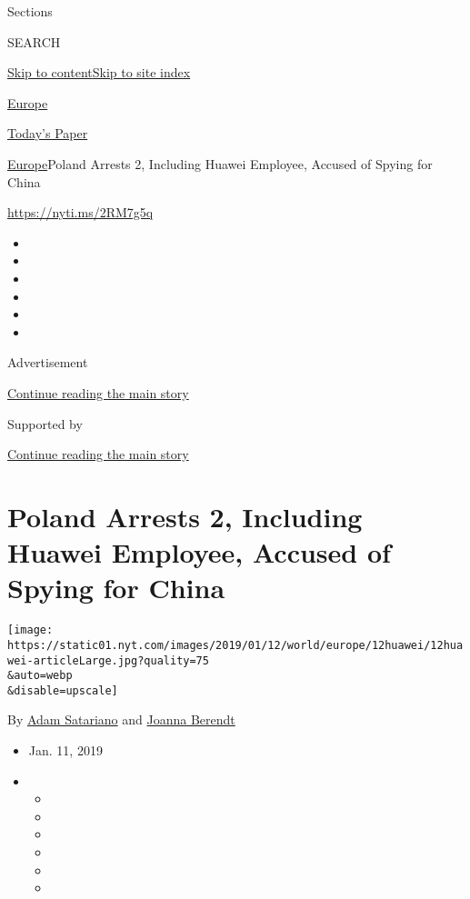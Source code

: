 Sections

SEARCH

\protect\hyperlink{site-content}{Skip to
content}\protect\hyperlink{site-index}{Skip to site index}

\href{https://www.nytimes.com/section/world/europe}{Europe}

\href{https://myaccount.nytimes.com/auth/login?response_type=cookie\&client_id=vi}{}

\href{https://www.nytimes.com/section/todayspaper}{Today's Paper}

\href{/section/world/europe}{Europe}\textbar{}Poland Arrests 2,
Including Huawei Employee, Accused of Spying for China

\url{https://nyti.ms/2RM7g5q}

\begin{itemize}
\item
\item
\item
\item
\item
\item
\end{itemize}

Advertisement

\protect\hyperlink{after-top}{Continue reading the main story}

Supported by

\protect\hyperlink{after-sponsor}{Continue reading the main story}

\hypertarget{poland-arrests-2-including-huawei-employee-accused-of-spying-for-china}{%
\section{Poland Arrests 2, Including Huawei Employee, Accused of Spying
for
China}\label{poland-arrests-2-including-huawei-employee-accused-of-spying-for-china}}

\texttt{[image: https://static01.nyt.com/images/2019/01/12/world/europe/12huawei/12huawei-articleLarge.jpg?quality=75\\\&auto=webp\\\&disable=upscale]}

By \href{https://www.nytimes.com/by/adam-satariano}{Adam Satariano} and
\href{https://www.nytimes.com/by/joanna-berendt}{Joanna Berendt}

\begin{itemize}
\item
  Jan. 11, 2019
\item
  \begin{itemize}
  \item
  \item
  \item
  \item
  \item
  \item
  \end{itemize}
\end{itemize}

